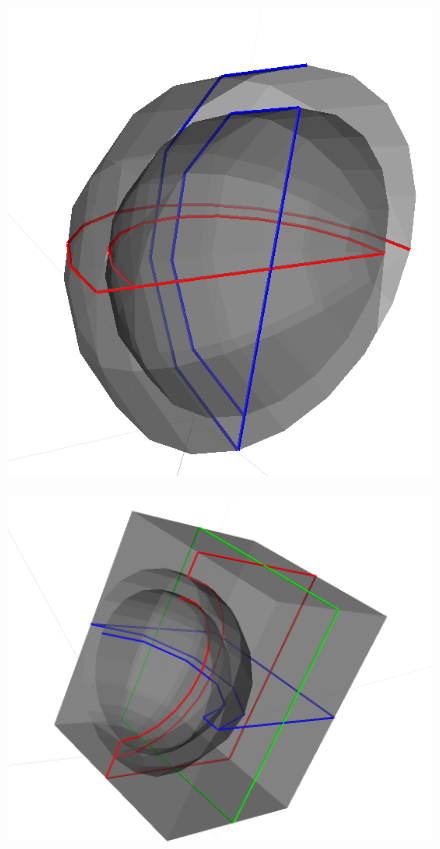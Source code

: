 \documentclass[12pt,a4paper]{article}
\begin{document}
\begin{figure}[h!]
\centering
\begin{minipage}{.4\textwidth}
  \centering
  \includegraphics[height=1\linewidth]{Images//Booleans/SphereUnion.png}
  \label{fig:test1}
\end{minipage}%
\begin{minipage}{.4\textwidth}
  \centering
  \includegraphics[height=1\linewidth]{Images//Booleans//SphereSubtraction.png}
  \label{fig:test2}
\end{minipage}%
\end{figure}
\end{document}
